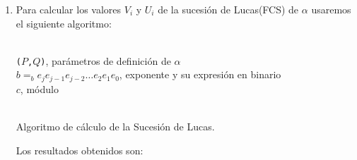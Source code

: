 \begin{enumerate}
		\item Para calcular los valores $V_i$ y $U_i$ de la sucesión de Lucas(FCS) de $\alpha$ usaremos el
		siguiente algoritmo:
		\begin{algorithm}[H]
			\begin{algorithmic}[1]
				\REQUIRE \ \\
					\texttt{($P$,$Q$)}, parámetros de definición de $\alpha$ \\
					\texttt{$b =_b e_je_{j-1}e_{j-2}\dots e_2e_1e_0$}, exponente y su expresión en binario \\
					\texttt{$c$}, módulo\\ \
						\STATE{\texttt{$k = 2 \cdot k$}}
					\ELSE
						\STATE{\texttt{$k = 2\cdot k + 1$}}
					\ENDIF
				\ENDWHILE
			\end{algorithmic}
			\caption{Algoritmo de cálculo de la Sucesión de Lucas.}
			\label{Lucas-Suc}
		\end{algorithm}
		
		Los resultados obtenidos son:
		

\end{enumerate}
